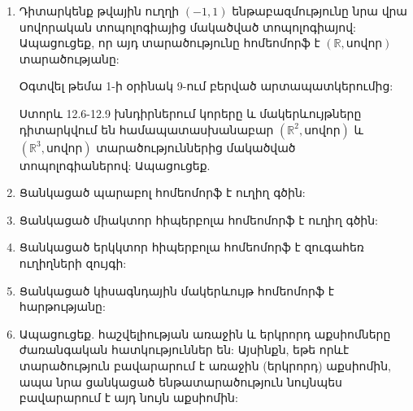 \begin{enumerate}[label=\thesection.\arabic*.]
\begin{hint}

\par Ընտրելով $f_i: A_i A_{i+1} \to B_i B_{i+1}, i=1, 2, \dots, 5$ և $f_6: A_6 A_1 \to B_6 B_1$ հոմեոմորֆիզմներ կառուցեք հոմեոմորֆիզմ շրջանագծի և երեքնակաձևի միջև օգտվելով թեորեմ 3-ից:
\end{hint}

\item Դիտարկենք թվային ուղղի $(-1, 1)$ ենթաբազմությունը նրա վրա սովորական տոպոլոգիայից մակածված տոպոլոգիայով: Ապացուցեք, որ այդ տարածությունը հոմեոմորֆ է $(\mathbb{R}, \text{սովոր})$ տարածությանը:

\begin{hint}
Օգտվել թեմա 1-ի օրինակ 9-ում բերված արտապատկերումից:
\end{hint}

\par Ստորև 12.6-12.9 խնդիրներում կորերը և մակերևույթները դիտարկվում են համապատասխանաբար $(\mathbb{R}^2, \text{սովոր})$ և $(\mathbb{R}^3, \text{սովոր})$ տարածություններից մակածված տոպոլոգիաներով: Ապացուցեք.

\item Ցանկացած պարաբոլ հոմեոմորֆ է ուղիղ գծին:

\item Ցանկացած միակտոր հիպերբոլա հոմեոմորֆ է ուղիղ գծին:

\item Ցանկացած երկկտոր հիպերբոլա հոմեոմորֆ է զուգահեռ ուղիղների զույգի:

\item Ցանկացած կիսագնդային մակերևույթ հոմեոմորֆ է հարթությանը:

\item Ապացուցեք. հաշվելիության առաջին և երկրորդ աքսիոմները ժառանգական հատկություններ են: Այսինքն, եթե որևէ տարածություն բավարարում է առաջին (երկրորդ) աքսիոմին, ապա նրա ցանկացած ենթատարածություն նույնպես բավարարում է այդ նույն աքսիոմին:    
\end{enumerate}
